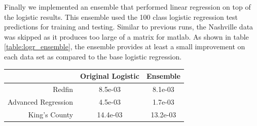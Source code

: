 \documentclass[10pt]{article}
\begin{document}
\begin{multicols}{2}
\begin{center}
			\label{fig:logr_MSE_Accuracy}
		\end{center}
		\par
			Finally we implemented an ensemble that performed linear regression on top of the logistic results. This ensemble used the 100 class logistic regression test predictions for training and testing. Similar to previous runs, the Nashville data was skipped as it produces too large of a matrix for matlab. As shown in table \ref{table:logr_ensemble}, the ensemble provides at least a small improvement on each data set as compared to the base logistic regression.
		\par
        	\captionsetup{type=table}
			\begin{tabular}{r|c|c}
				& \small{Original Logistic} & \small{Ensemble} \\
				\hline
				\small{Redfin} & \small{8.5e-03} & \small{8.1e-03} \\
				\hline
				\small{Advanced Regression} & \small{4.5e-03} & \small{1.7e-03} \\
				\hline
				\small{King's County} & \small{14.4e-03} & \small{13.2e-03} \\
				\hline
			\end{tabular}
			\label{table:logr_ensemble}        
			\setlength{\parindent}{15pt}

\end{multicols}
\end{document}

